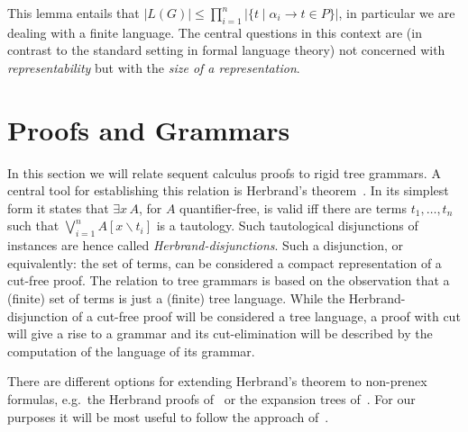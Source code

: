 \documentclass{LMCS}
\theoremstyle{plain}
\theoremstyle{definition}
\newcommand{\sop}{[}
\newcommand{\scl}{]}
\newcommand{\sel}[2]{#1 \backslash #2}
\newcommand{\unsubst}[2]{\sop \sel{#1}{#2} \scl}
\newcommand{\Lang}[1]{L(#1)}	\newcommand{\Gram}[1]{\mathrm{G}(#1)}	\newcommand{\Gramreg}[1]{\mathrm{G}_0(#1)}
\newcommand{\Lor}{\bigvee}
\begin{document}
This lemma entails that $|\Lang{G}| \leq \prod_{i=1}^n |\{ t \mid \alpha_i\rightarrow t \in P \}|$,
in particular we are dealing with a finite language. The central questions in this
context are (in contrast to the standard setting in formal language theory)
not concerned with {\em representability} but with the {\em size of a
representation}.




\section{Proofs and Grammars}\label{sec.proofs_grammars}

In this section we will relate sequent calculus proofs to rigid tree grammars.
A central tool for establishing this relation is Herbrand's
theorem~\cite{Herbrand30Recherches,Buss95Herbrand}. In its simplest form
it states that $\exists x\, A$, for $A$ quantifier-free, is valid iff
there are terms $t_1,\ldots, t_n$ such that $\Lor_{i=1}^n A\unsubst{x}{t_i}$
is a tautology. Such tautological disjunctions of instances are hence
called {\em Herbrand-disjunctions}. 
Such a disjunction, or equivalently: the set
of terms, can be considered a compact representation of a cut-free proof.
The relation to tree grammars is based on the observation that a (finite) set
of terms is just a (finite) tree language. While the Herbrand-disjunction of
a cut-free proof will be considered a tree language, a proof with cut will
give a rise to a grammar and its cut-elimination will be described by the
computation of the language of its grammar. 

There are different options for extending Herbrand's theorem to
non-prenex formulas, e.g.\ the Herbrand proofs
of~\cite{Buss95Herbrand} or the expansion trees
of~\cite{Miller87Compact}.  For our purposes it will be most useful to
follow the approach of~\cite{Baaz94Skolemization}.
\end{document}
